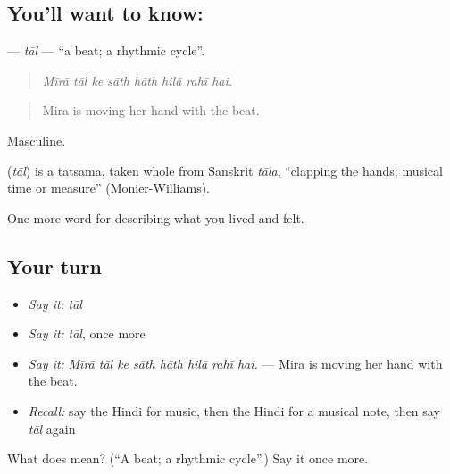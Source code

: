 \subsection*{You'll want to know: }
\textbf{} — \emph{tāl} — \textquotedblleft{}a beat; a rhythmic cycle\textquotedblright{}.

\begin{quote}
       
\end{quote}

\begin{quote}
\emph{Mīrā tāl ke sāth hāth hilā rahī hai.}
\end{quote}

\begin{quote}
Mira is moving her hand with the beat.
\end{quote}

Masculine.

\begin{cousinweb}
\textbf{} (\emph{tāl}) is a tatsama, taken whole from Sanskrit \emph{tāla}, \textquotedblleft{}clapping the hands; musical time or measure\textquotedblright{} (Monier-Williams).
\end{cousinweb}

\begin{grammarlens}[title={What you've built}]
One more word for describing what you lived and felt.
\end{grammarlens}

\subsection*{Your turn}
\begin{itemize}
\raggedright
  \item \emph{Say it:} \emph{tāl}
  \item \emph{Say it:} \emph{tāl}, once more
  \item \emph{Say it:} \emph{Mīrā tāl ke sāth hāth hilā rahī hai.} — Mira is moving her hand with the beat.
  \item \emph{Recall:} say the Hindi for music, then the Hindi for a musical note, then say \emph{tāl} again
\end{itemize}

\begin{tcolorbox}[breakable,colback=teal!4,colframe=teal!35!black,title={Before you move on}]
What does  mean? (\textquotedblleft{}A beat; a rhythmic cycle\textquotedblright{}.) Say it once more.
\end{tcolorbox}
